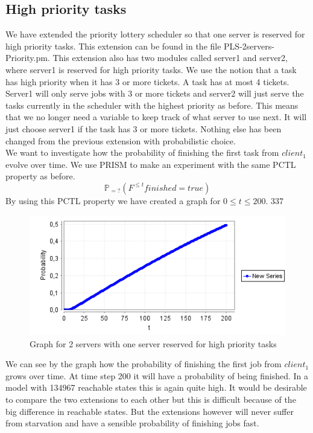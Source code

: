 \documentclass[12pt]{report}
\begin{document}
\subsection*{High priority tasks}
We have extended the priority lottery scheduler so that one server is reserved for high priority tasks. This extension can be found in the file PLS-2servers-
Priority.pm. This extension also has two modules called server1 and server2, where server1 is reserved for high priority tasks. We use the notion that a task has high priority when it has 3 or more tickets. A task has at most 4 tickets. Server1 will only serve jobs with 3 or more tickets and server2 will just serve the tasks currently in the scheduler with the highest priority as before. This means that we no longer need a variable to keep track of what server to use next. It will just choose server1 if the task has 3 or more tickets. Nothing else has been changed from the previous extension with probabilistic choice. 
\\
We want to investigate how the probability of finishing the first task from $client_1$ evolve over time. We use PRISM to make an experiment with the same PCTL property as before.
$$\mathbb{P}_{=?}( F^{\leq t} finished=true)$$
By using this PCTL property we have created a graph for $0 \leq t \leq 200$. 337
\begin{figure}[H]
	\begin{center}
		\includegraphics[scale=0.75]{../GFX/C2.png}
	\end{center}
	\caption{Graph for 2 servers with one server reserved for high priority tasks}
\end{figure}
We can see by the graph how the probability of finishing the first job from $client_1$ grows over time. At time step 200 it will have a probability of being finished. In a model with 134967 reachable states this is again quite high. It would be desirable to compare the two extensions to each other but this is difficult because of the big difference in reachable states. But the extensions however will never suffer from starvation and have a sensible probability of finishing jobs fast.
\end{document}
